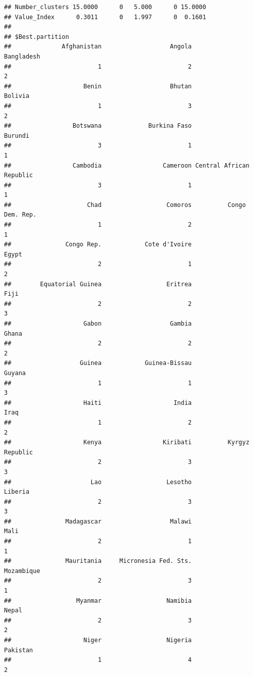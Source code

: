 \documentclass[
]{article}
\begin{document}
\begin{verbatim}
## Number_clusters 15.0000      0   5.000      0 15.0000
## Value_Index      0.3011      0   1.997      0  0.1601
## 
## $Best.partition
##              Afghanistan                   Angola               Bangladesh 
##                        1                        2                        2 
##                    Benin                   Bhutan                  Bolivia 
##                        1                        3                        2 
##                 Botswana             Burkina Faso                  Burundi 
##                        3                        1                        1 
##                 Cambodia                 Cameroon Central African Republic 
##                        3                        1                        1 
##                     Chad                  Comoros          Congo Dem. Rep. 
##                        1                        2                        1 
##               Congo Rep.            Cote d'Ivoire                    Egypt 
##                        2                        1                        2 
##        Equatorial Guinea                  Eritrea                     Fiji 
##                        2                        2                        3 
##                    Gabon                   Gambia                    Ghana 
##                        2                        2                        2 
##                   Guinea            Guinea-Bissau                   Guyana 
##                        1                        1                        3 
##                    Haiti                    India                     Iraq 
##                        1                        2                        2 
##                    Kenya                 Kiribati          Kyrgyz Republic 
##                        2                        3                        3 
##                      Lao                  Lesotho                  Liberia 
##                        2                        3                        3 
##               Madagascar                   Malawi                     Mali 
##                        2                        1                        1 
##               Mauritania     Micronesia Fed. Sts.               Mozambique 
##                        2                        3                        1 
##                  Myanmar                  Namibia                    Nepal 
##                        2                        3                        2 
##                    Niger                  Nigeria                 Pakistan 
##                        1                        4                        2 

\end{verbatim}
\end{document}
